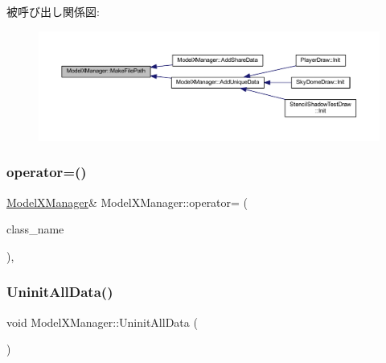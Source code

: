 被呼び出し関係図\+:
\nopagebreak
\begin{figure}[H]
\begin{center}
\leavevmode
\includegraphics[width=350pt]{class_model_x_manager_a2d367047714442f8a928e4360d11b773_icgraph}
\end{center}
\end{figure}
\mbox{\label{class_model_x_manager_adc65f6b4b9b06b4a20923245606175d8}} 
\subsubsection{\texorpdfstring{operator=()}{operator=()}}
{\footnotesize\ttfamily \mbox{\hyperlink{class_model_x_manager}{Model\+X\+Manager}}\& Model\+X\+Manager\+::operator= (\begin{DoxyParamCaption}\item[{const \mbox{\hyperlink{class_model_x_manager}{Model\+X\+Manager}} \&}]{class\+\_\+name }\end{DoxyParamCaption})\hspace{0.3cm}{\ttfamily [private]}, {\ttfamily [delete]}}

\mbox{\label{class_model_x_manager_a915bf3c57058e235d91db06f3fe5f538}} 
\subsubsection{\texorpdfstring{Uninit\+All\+Data()}{UninitAllData()}}
{\footnotesize\ttfamily void Model\+X\+Manager\+::\+Uninit\+All\+Data (\begin{DoxyParamCaption}{ }\end{DoxyParamCaption})\hspace{0.3cm}{\ttfamily [static]}}



